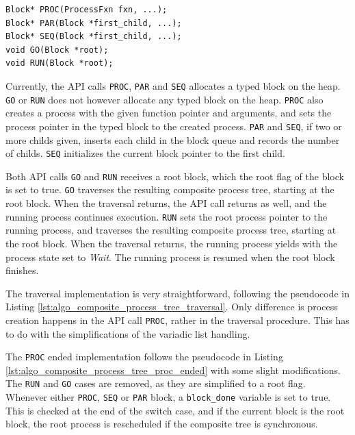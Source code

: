 \noindent\begin{minipage}{\textwidth}
\begin{lstlisting}[style={CustomC},caption={Composite process API prototypes},label={lst:composite_process_api_prototypes}]
Block* PROC(ProcessFxn fxn, ...);
Block* PAR(Block *first_child, ...);
Block* SEQ(Block *first_child, ...);
void GO(Block *root);
void RUN(Block *root);
\end{lstlisting}
\end{minipage}

Currently, the API calls \texttt{PROC}, \texttt{PAR} and \texttt{SEQ} allocates a typed block on the heap. \texttt{GO} or \texttt{RUN} does not however allocate any typed block on the heap. \texttt{PROC} also creates a process with the given function pointer and arguments, and sets the process pointer in the typed block to the created process. \texttt{PAR} and \texttt{SEQ}, if two or more childs given, inserts each child in the block queue and records the number of childs. \texttt{SEQ} initializes the current block pointer to the first child. 

Both API calls \texttt{GO} and \texttt{RUN} receives a root block, which the root flag of the block is set to true. \texttt{GO} traverses the resulting composite process tree, starting at the root block. When the traversal returns, the API call returns as well, and the running process continues execution. \texttt{RUN} sets the root process pointer to the running process, and traverses the resulting composite process tree, starting at the root block. When the traversal returns, the running process yields with the process state set to \textit{Wait}. The running process is resumed when the root block finishes.

The traversal implementation is very straightforward, following the pseudocode in Listing \ref{lst:algo_composite_process_tree_traversal}. Only difference is process creation happens in the API call \texttt{PROC}, rather in the traversal procedure. This has to do with the simplifications of the variadic list handling. 

The \texttt{PROC} ended implementation follows the pseudocode in Listing \ref{lst:algo_composite_process_tree_proc_ended} with some slight modifications. The \texttt{RUN} and \texttt{GO} cases are removed, as they are simplified to a root flag. Whenever either \texttt{PROC}, \texttt{SEQ} or \texttt{PAR} block, a \texttt{block\_done} variable is set to true. This is checked at the end of the switch case, and if the current block is the root block, the root process is rescheduled if the composite tree is synchronous. 

